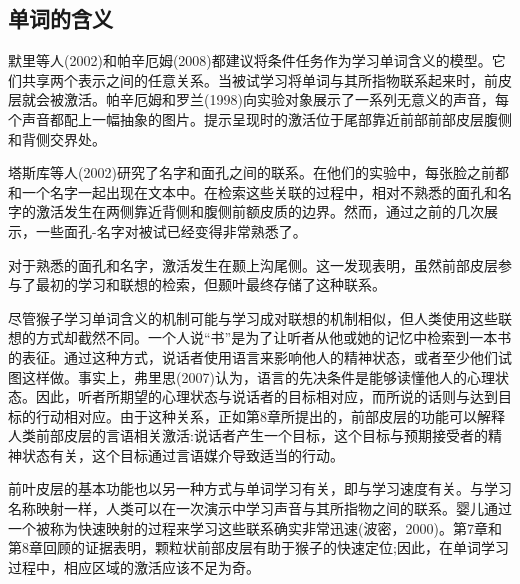 \subsection{单词的含义}
默里等人(2002)和帕辛厄姆(2008)都建议将条件任务作为学习单词含义的模型。它们共享两个表示之间的任意关系。当被试学习将单词与其所指物联系起来时，前皮层就会被激活。帕辛厄姆和罗兰(1998)向实验对象展示了一系列无意义的声音，每个声音都配上一幅抽象的图片。提示呈现时的激活位于尾部靠近前部前部皮层腹侧和背侧交界处。
\par
塔斯库等人(2002)研究了名字和面孔之间的联系。在他们的实验中，每张脸之前都和一个名字一起出现在文本中。在检索这些关联的过程中，相对不熟悉的面孔和名字的激活发生在两侧靠近背侧和腹侧前额皮质的边界。然而，通过之前的几次展示，一些面孔-名字对被试已经变得非常熟悉了。
\par
对于熟悉的面孔和名字，激活发生在颞上沟尾侧。这一发现表明，虽然前部皮层参与了最初的学习和联想的检索，但颞叶最终存储了这种联系。
\par
尽管猴子学习单词含义的机制可能与学习成对联想的机制相似，但人类使用这些联想的方式却截然不同。一个人说“书”是为了让听者从他或她的记忆中检索到一本书的表征。通过这种方式，说话者使用语言来影响他人的精神状态，或者至少他们试图这样做。事实上，弗里思(2007)认为，语言的先决条件是能够读懂他人的心理状态。因此，听者所期望的心理状态与说话者的目标相对应，而所说的话则与达到目标的行动相对应。由于这种关系，正如第8章所提出的，前部皮层的功能可以解释人类前部皮层的言语相关激活:说话者产生一个目标，这个目标与预期接受者的精神状态有关，这个目标通过言语媒介导致适当的行动。
\par
前叶皮层的基本功能也以另一种方式与单词学习有关，即与学习速度有关。与学习名称映射一样，人类可以在一次演示中学习声音与其所指物之间的联系。婴儿通过一个被称为快速映射的过程来学习这些联系确实非常迅速(波密，2000)。第7章和第8章回顾的证据表明，颗粒状前部皮层有助于猴子的快速定位;因此，在单词学习过程中，相应区域的激活应该不足为奇。
